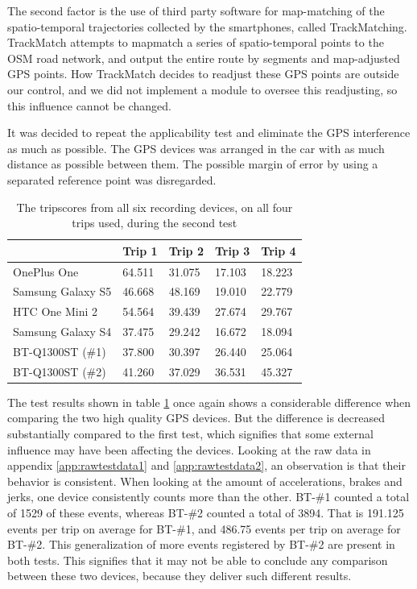 The second factor is the use of third party software for map-matching of the spatio-temporal trajectories collected by the smartphones, called TrackMatching\citep{trackmatch}. TrackMatch attempts to mapmatch a series of spatio-temporal points to the OSM road network, and output the entire route by segments and map-adjusted GPS points. How TrackMatch decides to readjust these GPS points are outside our control, and we did not implement a module to oversee this readjusting, so this influence cannot be changed. 

It was decided to repeat the applicability test and eliminate the GPS interference as much as possible. The GPS devices was arranged in the car with as much distance as possible between them. The possible margin of error by using a separated reference point was disregarded. 

\begin{table}[tb]
\centering
\caption{The tripscores from all six recording devices, on all four trips used, during the second test}
\label{tab:smartphone_test_two}
\begin{tabular}{|l|llll|}
\hline
\rowcolor{tablegreen}

                   & \textbf{Trip 1}    & \textbf{Trip 2}    & \textbf{Trip 3}    & \textbf{Trip 4}  \\\hline
OnePlus One        & 64.511  & 31.075  & 17.103  & 18.223 \\
Samsung Galaxy S5  & 46.668  & 48.169  & 19.010  & 22.779 \\
HTC One Mini 2     & 54.564  & 39.439  & 27.674  & 29.767 \\
Samsung Galaxy S4  & 37.475  & 29.242  & 16.672  & 18.094 \\
BT-Q1300ST (\#1)   & 37.800  & 30.397  & 26.440  & 25.064 \\
BT-Q1300ST (\#2)   & 41.260  & 37.029  & 36.531  & 45.327 \\\hline

\end{tabular}
\end{table}

The test results shown in table \ref{tab:smartphone_test_two} once again shows a considerable difference when comparing the two high quality GPS devices. But the difference is decreased substantially compared to the first test, which signifies that some external influence may have been affecting the devices. Looking at the raw data in appendix \ref{app:rawtestdata1} and \ref{app:rawtestdata2}, an observation is that their behavior is consistent. When looking at the amount of accelerations, brakes and jerks, one device consistently counts more than the other. BT-\#1 counted a total of 1529 of these events, whereas BT-\#2 counted a total of 3894. That is 191.125 events per trip on average for BT-\#1, and 486.75 events per trip on average for BT-\#2. This generalization of more events registered by BT-\#2 are present in both tests. This signifies that it may not be able to conclude any comparison between these two devices, because they deliver such different results.

